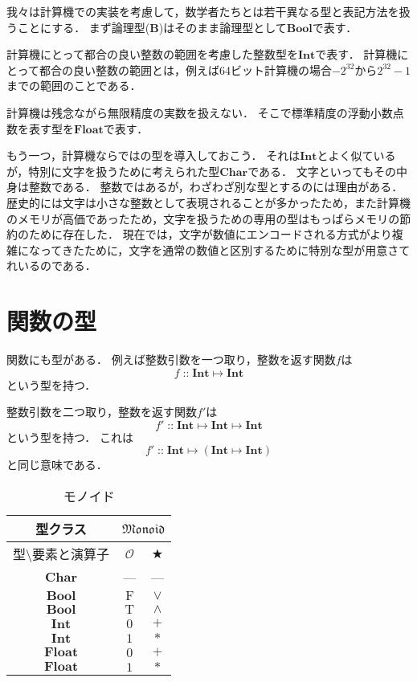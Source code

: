 \documentclass[twocolumn]{jsbook}
\newcommand{\typeclassname}[1]{\mathfrak{#1}}
\newcommand{\typeclassmonoid}{\typeclassname{Monoid}}
\newcommand{\typename}[1]{\mathbf{#1}}
\newcommand{\typebool}{\typename{Bool}}
\newcommand{\typechar}{\typename{Char}}
\newcommand{\typeint}{\typename{Int}}
\newcommand{\typefloat}{\typename{Float}}
\newcommand{\morph}[2]{#1\mapsto#2}
\newcommand{\mmorph}[3]{#1\mapsto#2\mapsto#3}
\newcommand{\mmorphwithparenthesis}[3]{#1\mapsto(#2\mapsto#3)}
\newcommand{\constantname}[1]{\mathrm{#1}}
\newcommand{\constanttrue}{\constantname{T}}
\newcommand{\constantfalse}{\constantname{F}}
\newcommand{\binaryadd}{+}
\newcommand{\binarymultiply}{*}
\newcommand{\binaryor}{\vee}
\newcommand{\binaryand}{\wedge}
\newcommand{\istypeof}{\mathop{::}}
\newcommand{\mathbinaryop}{\bigstar}
\newcommand{\mathidentity}{\mathcal{O}}
\newcommand{\mathsetname}[1]{\boldsymbol{#1}}
\begin{document}
我々は計算機での実装を考慮して，数学者たちとは若干異なる型と表記方法を扱うことにする．
まず論理型($\mathsetname{B}$)はそのまま論理型として$\typebool$で表す．

計算機にとって都合の良い整数の範囲を考慮した整数型を$\typeint$で表す．
計算機にとって都合の良い整数の範囲とは，例えば64ビット計算機の場合$-2^{32}$から$2^{32}-1$までの範囲のことである．

計算機は残念ながら無限精度の実数を扱えない．
そこで標準精度の浮動小数点数を表す型を$\typefloat$で表す．

もう一つ，計算機ならではの型を導入しておこう．
それは$\typeint$とよく似ているが，特別に文字を扱うために考えられた型$\typechar$である．
文字といってもその中身は整数である．
整数ではあるが，わざわざ別な型とするのには理由がある．
歴史的には文字は小さな整数として表現されることが多かったため，また計算機のメモリが高価であったため，文字を扱うための専用の型はもっぱらメモリの節約のために存在した．
現在では，文字が数値にエンコードされる方式がより複雑になってきたために，文字を通常の数値と区別するために特別な型が用意さてれいるのである．


\section{関数の型}

関数にも型がある．
例えば整数引数を一つ取り，整数を返す関数$f$は$$f\istypeof\morph{\typeint}{\typeint}$$という型を持つ．

整数引数を二つ取り，整数を返す関数$f'$は$$f'\istypeof\mmorph{\typeint}{\typeint}{\typeint}$$という型を持つ．
これは$$f'\istypeof\mmorphwithparenthesis{\typeint}{\typeint}{\typeint}$$と同じ意味である．

\begin{table}
\caption{モノイド}
\label{tab:monoids}
\begin{center}
\begin{tabular}{||c||c|c||}
\hline
型クラス
    &\multicolumn{2}{|c||}{$\typeclassmonoid$}\\
\hline\hline
型$\setminus$要素と演算子
    &$\mathidentity$
    &$\mathbinaryop$\\
\hline
$\typechar$
    &---
    &---\\
\hline
$\typebool$
    &$\constantfalse$
    &$\binaryor$\\
\hline
$\typebool$
    &$\constanttrue$
    &$\binaryand$\\
\hline
$\typeint$
    &$0$
    &$\binaryadd$\\
\hline
$\typeint$
    &$1$
    &$\binarymultiply$\\
\hline
$\typefloat$
    &$0$
    &$\binaryadd$\\
\hline
$\typefloat$
    &$1$
    &$\binarymultiply$\\
\hline
\end{tabular}
\end{center}
\end{table}
\end{document}
